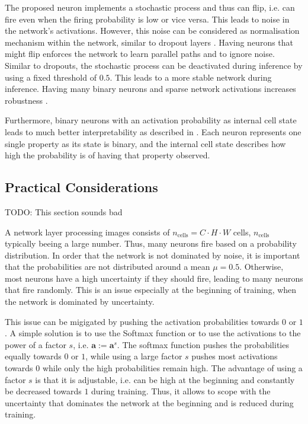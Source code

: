 The proposed neuron implements a stochastic process and thus can flip, i.e. can fire even when the firing probability is low or vice versa.
This leads to noise in the network's activations.
However, this noise can be considered as normalisation mechanism within the network, similar to dropout layers .
Having neurons that might flip enforces the network to learn parallel paths and to ignore noise.
Similar to dropouts, the stochastic process can be deactivated during inference by using a fixed threshold of $0.5$. This leads to a more stable network during inference.
Having many binary neurons and sparse network activations increases robustness \cite{Ahmad_Hawkins_2015}.

Furthermore, binary neurons with an activation probability as internal cell state leads to much better interpretability as described in .
Each neuron represents one single property as its state is binary, and the internal cell state describes how high the probability is of having that property observed.


\subsection{Practical Considerations}
TODO: This section sounds bad

A network layer processing images consists of $n_{\text{cells}} = C\cdot H \cdot W$ cells, $n_{\text{cells}}$ typically beeing a large number.
Thus, many neurons fire based on a probability distribution. In order that the network is not dominated by noise, it is important that the probabilities are not distributed around a mean $\mu = 0.5$.
Otherwise, most neurons have a high uncertainty if they should fire, leading to many neurons that fire randomly.
This is an issue especially at the beginning of training, when the network is dominated by uncertainty.

This issue can be migigated by pushing the activation probabilities towards $0$ or $1$. A simple solution is to use the Softmax function or to use the activations to the power of a factor $s$, i.e. $\boldsymbol{a} := \boldsymbol{a}^s$. The softmax function pushes the probabilities equally towards $0$ or $1$, while using a large factor $s$ pushes most activations towards $0$ while only the high probabilities remain high.
The advantage of using a factor $s$ is that it is adjustable, i.e. can be high at the beginning and constantly be decreased towards $1$ during training. Thus, it allows to scope with the uncertainty that dominates the network at the beginning and is reduced during training.
























